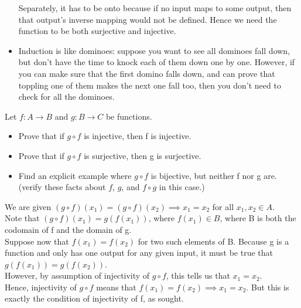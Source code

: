 \documentclass[11 pt]{article}
\begin{document}
\begin{problem}
\begin{solution}
\begin{itemize}
	Separately, it has to be onto because if no input maps to some output, then that output's inverse mapping would not be defined. Hence we need the function to be both surjective and injective.
\item Induction is like dominoes: suppose you want to see all dominoes fall down, but don't have the time to knock each of them down one by one.
	However, if you can make sure that the first domino falls down, and can prove that toppling one of them makes the next one fall too, then you don't need to check for all the dominoes.
   \end{itemize}
\end{solution}
    
    \pagebreak %

    \begin{problem}
	    Let $f: A \rightarrow B$ and $g: B \rightarrow C$ be functions.
	\begin{itemize}
		\item Prove that if $g\circ f$ is injective, then f is injective.
		\item Prove that if $g\circ f$ is surjective, then g is surjective.
		\item Find an explicit example where  $g\circ f$ is bijective, but neither f nor g are. (verify these facts about  $f$, $g$, and $f\circ g$ in this case.)
	\end{itemize}
    \end{problem}

    \begin{solution}
	\begin{\itemize}
	\item We are given $(g\circ f)(x_{1})=(g\circ f)(x_{2})\implies x_{1}=x_{2}$ for all $x_{1}, x_{2} \in A$.\\
    Note that $(g\circ f)(x_1)=g(f(x_1))$, where $f(x_1)\in B$, where B is both the codomain of f and the domain of g.\\
    Suppose now that $f(x_1)=f(x_2)$ for two such elements of B. Because g is a function and only has one output for any given input, it must be true that $g(f(x_1))=g(f(x_2))$.\\
    However, by assumption of injectivity of $g\circ f$, this tells us that $x_1=x_2$.\\
    Hence, injectivity of  $g\circ f$ means that $f(x_1)=f(x_2)\implies x_1=x_2$. But this is exactly the condition of injectivity of f, as sought.


\end{\itemize}
\end{solution}
\end{problem}
\end{document}
